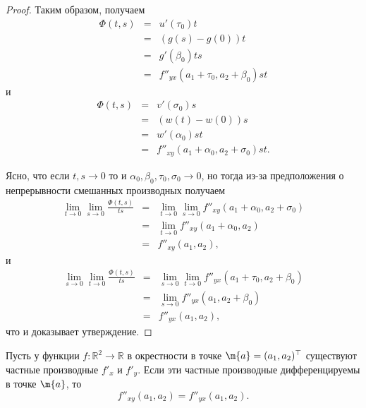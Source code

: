 \begin{proof}
Таким образом, получаем
\begin{eqnarray*}
    \Phi(t,s) &=& u'(\tau_0)t \\
             &=& (g(s) - g(0))t \\
             &=& g'(\beta_0)ts \\
             &=& f''_{yx}(a_1 + \tau_0,a_2+\beta_0)st
\end{eqnarray*}
и
\begin{eqnarray*}
\Phi(t,s) &=& v'(\sigma_0)s \\
             &=& (w(t) - w(0))s \\
             &=& w'(\alpha_0)st \\
             &=& f''_{xy}(a_1 + \alpha_0,a_2+\sigma_0)st.
\end{eqnarray*}

Ясно, что если $t,s \to 0$ то и $\alpha_0, \beta_0, \tau_0, \sigma_0 \to 0$, но тогда из-за предположения о непрерывности смешанных производных получаем
\begin{eqnarray*}
    \lim_{t\to 0} \lim_{s \to 0} \frac{\Phi(t,s)}{ts} &=&  \lim_{t\to 0} \lim_{s \to 0} f''_{xy}(a_1 + \alpha_0,a_2+\sigma_0) \\
    &=& \lim_{t \to 0} f''_{xy}(a_1 + \alpha_0,a_2) \\
    &=& f''_{xy}(a_1,a_2),
\end{eqnarray*}
и
\begin{eqnarray*}
    \lim_{s\to 0} \lim_{t \to 0} \frac{\Phi(t,s)}{ts} &=& \lim_{s\to 0} \lim_{t \to 0}f''_{yx}(a_1 + \tau_0,a_2+\beta_0)\\
    &=& \lim_{s\to 0}f''_{yx}(a_1,a_2+\beta_0) \\
    &=& f''_{yx}(a_1,a_2),
\end{eqnarray*}
что и доказывает утверждение.     
\end{proof}


\begin{theorem}[Юнг]\label{Yong}
    Пусть у функции $f:\mathbb{R}^2 \to \mathbb{R}$ в окрестности в точке $\m{a} = (a_1,a_2)^\top$ существуют частные производные $f'_{x}$ и $f'_{y}$. Если эти частные производные дифференцируемы в точке $\m{a}$, то
    \[
     f''_{xy}(a_1,a_2) = f''_{yx}(a_1,a_2).
    \]
\end{theorem}


